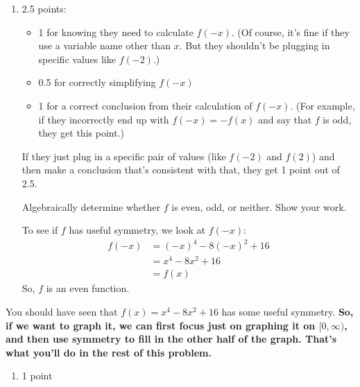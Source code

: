 \documentclass{article}
\begin{document}
\begin{enumerate}[resume]
\begin{enumerate}
  \item

    \begin{grading}
      2.5 points:
      \begin{itemize}[nosep]
      \item 1 for knowing they need to calculate $f(-x)$. (Of course, it's fine if they use a variable name other than $x$. But they shouldn't be plugging in specific values like $f(-2)$.) 
      \item 0.5 for correctly simplifying $f(-x)$
      \item 1 for a correct conclusion from their calculation of $f(-x)$. (For example, if they incorrectly end up with $f(-x) = - f(x)$ and say that $f$ is odd, they get this point.) 
      \end{itemize}
      If they just plug in a specific pair of values (like $f(-2)$ and $f(2)$) and then make a conclusion that's consistent with that, they get 1 point out of 2.5.
    \end{grading}

    \begin{problem}[\vfill\newpage]
      Algebraically determine whether $f$ is even, odd, or neither. Show your work. 
    \end{problem}

    \begin{solution}
      To see if $f$ has useful symmetry, we look at $f(-x)$:
      \begin{align*}
        f(-x) &= (-x)^4 - 8 (-x)^2 + 16 \\
        &= x^4 - 8 x^2 + 16 \\
        &= f(x)
      \end{align*}
      So, $f$ is an even function.
    \end{solution}

  \end{enumerate}

  You should have seen that $f(x) = x^4 - 8x^2 + 16$ has some useful symmetry. {\bf So, if we want to graph it, we can first focus just on graphing it on $[0, \infty)$, and then use symmetry to fill in the other half of the graph. That's what you'll do in the rest of this problem.}

  \begin{enumerate}[resume]
  \item

    \begin{grading}
      1 point
    \end{grading}


\end{enumerate}
\end{enumerate}
\end{document}
